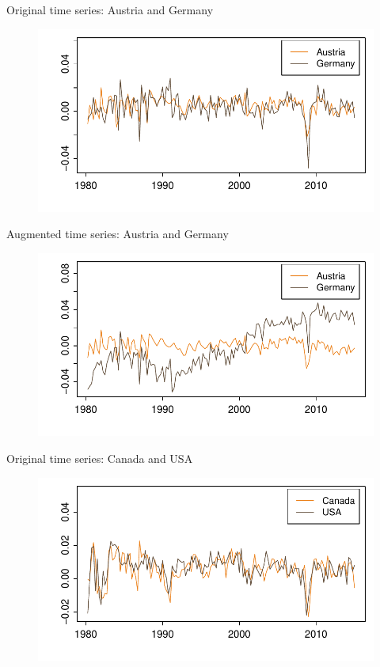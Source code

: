 \documentclass[10pt]{beamer}
\begin{document}
\begin{frame}{Original time series: Austria and Germany}
\begin{figure}
    		\centering
    		\includegraphics[height=0.65\textheight]{plots/gdp_AUT_DEU.pdf}
  	\end{figure}
\end{frame}

\begin{frame}{Augmented time series: Austria and Germany}
	\begin{figure}
    		\centering
    		\includegraphics[height=0.65\textheight]{plots/gdp_AUT_DEU_adj.pdf}
  	\end{figure}	
\end{frame}


\begin{frame}{Original time series: Canada and USA}
\begin{figure}
    		\centering
    		\includegraphics[height=0.65\textheight]{plots/gdp_CAN_USA.pdf}
  	\end{figure}
\end{frame}
\end{document}
